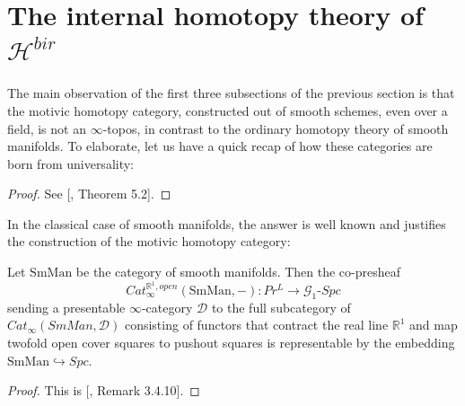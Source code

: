 \section{The internal homotopy theory of \texorpdfstring{$\mathcal{H}^{bir}$}{h}} 
The main observation of the first three subsections of the previous section is that the motivic homotopy category, constructed out of smooth schemes, even over a field, is not an $\infty$-topos, in contrast to the ordinary homotopy theory of smooth manifolds. To elaborate, let us have a quick recap of how these categories are born from universality:
\begin{proof}
    See [\cite{robalo2012noncommutative}, Theorem 5.2].
\end{proof}
In the classical case of smooth manifolds, the answer is well known and justifies the construction of the motivic homotopy category:
\begin{prop}
    Let $\mathrm{SmMan}$ be the category of smooth manifolds. Then the co-presheaf $$Cat_\infty^{\mathbb{R}^1,open}(\mathrm{SmMan}, -): Pr^L\to \mathcal{G}_1\mbox{-}Spc$$ sending a presentable $\infty$-category $\mathcal{D}$ to the full subcategory of $Cat_\infty(SmMan, \mathcal{D})$ consisting of functors that contract the real line $\mathbb{R}^1$ and map twofold open cover squares to pushout squares is representable by the embedding $\mathrm{SmMan}\hookrightarrow Spc$.
\end{prop} 
\begin{proof}
    This is [\cite{dugger1999sheaves}, Remark 3.4.10].
\end{proof}  
